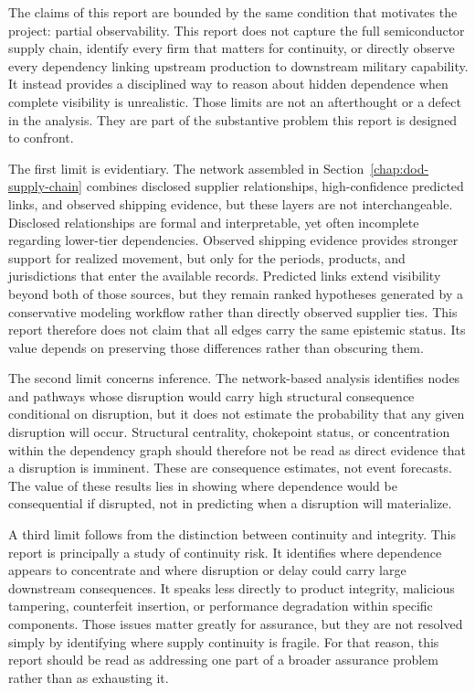 The claims of this report are bounded by the same condition that motivates the project: partial observability. This report does not capture the full semiconductor supply chain, identify every firm that matters for continuity, or directly observe every dependency linking upstream production to downstream military capability. It instead provides a disciplined way to reason about hidden dependence when complete visibility is unrealistic. Those limits are not an afterthought or a defect in the analysis. They are part of the substantive problem this report is designed to confront.

The first limit is evidentiary. The network assembled in Section~\ref{chap:dod-supply-chain} combines disclosed supplier relationships, high-confidence predicted links, and observed shipping evidence, but these layers are not interchangeable. Disclosed relationships are formal and interpretable, yet often incomplete regarding lower-tier dependencies. Observed shipping evidence provides stronger support for realized movement, but only for the periods, products, and jurisdictions that enter the available records. Predicted links extend visibility beyond both of those sources, but they remain ranked hypotheses generated by a conservative modeling workflow rather than directly observed supplier ties. This report therefore does not claim that all edges carry the same epistemic status. Its value depends on preserving those differences rather than obscuring them.

The second limit concerns inference. The network-based analysis identifies nodes and pathways whose disruption would carry high structural consequence conditional on disruption, but it does not estimate the probability that any given disruption will occur. Structural centrality, chokepoint status, or concentration within the dependency graph should therefore not be read as direct evidence that a disruption is imminent. These are consequence estimates, not event forecasts. The value of these results lies in showing where dependence would be consequential if disrupted, not in predicting when a disruption will materialize.

A third limit follows from the distinction between continuity and integrity. This report is principally a study of continuity risk. It identifies where dependence appears to concentrate and where disruption or delay could carry large downstream consequences. It speaks less directly to product integrity, malicious tampering, counterfeit insertion, or performance degradation within specific components. Those issues matter greatly for assurance, but they are not resolved simply by identifying where supply continuity is fragile. For that reason, this report should be read as addressing one part of a broader assurance problem rather than as exhausting it.

